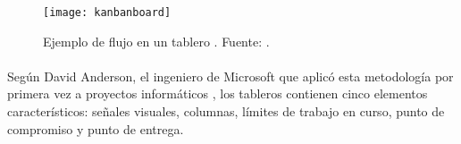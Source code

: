 \documentclass{subfiles}
\begin{document}
        \begin{figure}
        \centering
        \texttt{[image: kanbanboard]}
        \caption[Ejemplo de flujo en un tablero \Kanban.]{Ejemplo de flujo en un tablero \Kanban. Fuente: .}
        \label{fig:kanbanboard}
        \end{figure}

        \paragraph{}
        {Según David Anderson, el ingeniero de Microsoft que aplicó esta metodología por primera vez a proyectos informáticos \cite{book:anderson_david_kanban}, los tableros \Kanban contienen cinco elementos característicos: señales visuales, columnas, límites de trabajo en curso, punto de compromiso y punto de entrega.}
\end{document}
